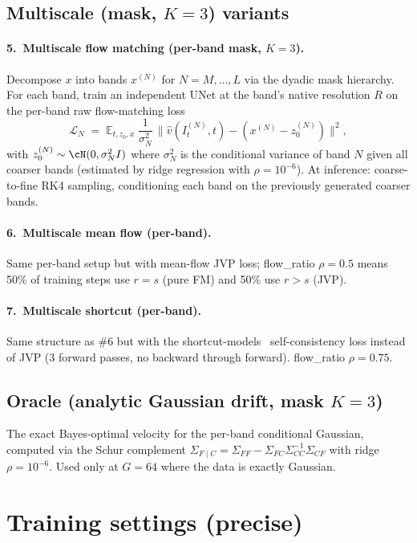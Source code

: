 \documentclass[11pt]{article}
\begin{document}
\subsection{Multiscale (mask, $K=3$) variants}
\paragraph{5.\ Multiscale flow matching (per-band mask, $K=3$).}
Decompose $x$ into bands $x^{(N)}$ for $N=M,\dots,L$ via the dyadic mask hierarchy. For each band, train an independent UNet at the band's native resolution $R$ on the per-band raw flow-matching loss
\begin{equation}
\mathcal{L}_N \;=\; \mathbb{E}_{t,z_0,x}\;\frac{1}{\sigma_N^2}\,\big\|\hat v(I_t^{(N)},t) - (x^{(N)} - z_0^{(N)})\big\|^2,
\end{equation}
with $z_0^{(N)} \sim \cN(0,\sigma_N^2 I)$ where $\sigma_N^2$ is the conditional variance of band $N$ given all coarser bands (estimated by ridge regression with $\rho=10^{-6}$). At inference: coarse-to-fine RK4 sampling, conditioning each band on the previously generated coarser bands.

\paragraph{6.\ Multiscale mean flow (per-band).}
Same per-band setup but with mean-flow JVP loss; flow\_ratio $\rho=0.5$ means 50\% of training steps use $r=s$ (pure FM) and 50\% use $r > s$ (JVP).

\paragraph{7.\ Multiscale shortcut (per-band).}
Same structure as \#6 but with the shortcut-models~\cite{frans2024shortcut} self-consistency loss instead of JVP (3 forward passes, no backward through forward). flow\_ratio $\rho=0.75$.

\subsection{Oracle (analytic Gaussian drift, mask $K=3$)}
The exact Bayes-optimal velocity for the per-band conditional Gaussian, computed via the Schur complement $\Sigma_{F\mid C} = \Sigma_{FF} - \Sigma_{FC}\Sigma_{CC}^{-1}\Sigma_{CF}$ with ridge $\rho=10^{-6}$. Used only at $G=64$ where the data is exactly Gaussian.

\section{Training settings (precise)}
\label{sec:training-settings}
\end{document}
